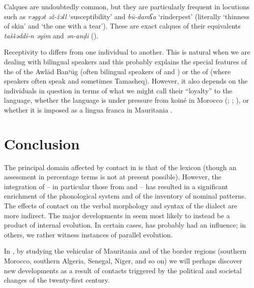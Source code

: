 \documentclass[output=paper]{langsci/langscibook}
\begin{document}

Calques are undoubtedly common, but they are particularly frequent in locutions such as \textit{rəggət} \textit{əž-žəll} ‘susceptibility’ and \textit{bū-damʕa} ‘rinderpest’ (literally ‘thinness of skin’ and ‘the one with a tear’). These are exact calques of their  equivalents \textit{taššəddi-n} \textit{əyim} and \textit{ən-anḍi} (\citealt{Taine-Cheikh2008chapter}).


Receptivity to  differs from one individual to another. This is natural when we are dealing with bilingual speakers and this probably explains the special features of the  of the Awlād Banʸūg (often bilingual speakers of  and ) or the  of  (where  speakers often speak  and sometimes Tamasheq). However, it also depends on the individuals in question in terms of what we might call their “loyalty” to the language, whether the language is under pressure from   koiné in Morocco (\citealt{Taine-Cheikh1997socio}; \citealt{Heath2002}; \citealt{Paciotti2017}), or whether it is imposed as a lingua franca in Mauritania \citep{Dia2007}.

\section{Conclusion} %

The principal domain affected by contact in  is that of the lexicon (though an assessment in percentage terms is not at present possible). However, the integration of  – in particular those from   and  – has resulted in a significant enrichment of the phonological system and of the inventory of nominal patterns. The effects of contact on the verbal morphology and syntax of the dialect are more indirect. The major developments in  seem most likely to instead be a product of internal evolution. In certain cases,  has probably had an influence; in others, we rather witness instances of parallel evolution. 

In , by studying the vehicular  of Mauritania and of the border regions (southern Morocco, southern Algeria, Senegal, Niger, and so on) we will perhaps discover new developments as a result of contacts triggered by the political and societal changes of the twenty-first century. 
\end{document}
